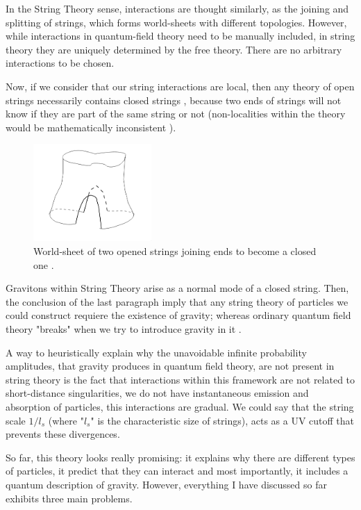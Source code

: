 \documentclass[12pt]{article}
\begin{document}
In the String Theory sense, interactions are thought similarly, as the joining and splitting of strings, which forms world-sheets with different topologies. However, while interactions in quantum-field theory need to be manually included, in string theory they are uniquely determined by the free theory. There are no arbitrary interactions to be chosen. 

Now, if we consider that our string interactions are local, then any theory of open strings necessarily contains closed strings \cite{Blumenhagen:2013fgp}, because two ends of strings will not know if they are part of the same string or not (non-localities within the theory would be mathematically inconsistent \cite{Polchinski:1998rq}).

\begin{figure}[h]
    \centering
    \includegraphics[width=0.4\textwidth]{uranga_closed_opened.png}
    \caption{World-sheet of two opened strings joining ends to become a closed one \cite{uranga}.}
\end{figure}

Gravitons within String Theory arise as a normal mode of a closed string. Then, the conclusion of the last paragraph imply that any string theory of particles we could construct requiere the existence of gravity; whereas ordinary quantum field theory "breaks" when we try to introduce gravity in it \cite{Becker:2006dvp}.

A way to heuristically explain why the unavoidable infinite probability amplitudes, that gravity produces in quantum field theory, are not present in string theory is the fact that interactions within this framework are not related to short-distance singularities, we do not have instantaneous emission and absorption of particles, this interactions are gradual. We could say that the string scale $1/l_s$ (where "$l_s$" is the characteristic size of strings), acts as a UV cutoff that prevents these divergences.

So far, this theory looks really promising: it explains why there are different types of particles, it predict that they can interact and most importantly, it includes a quantum description of gravity. However, everything I have discussed so far exhibits three main problems. 
\end{document}
